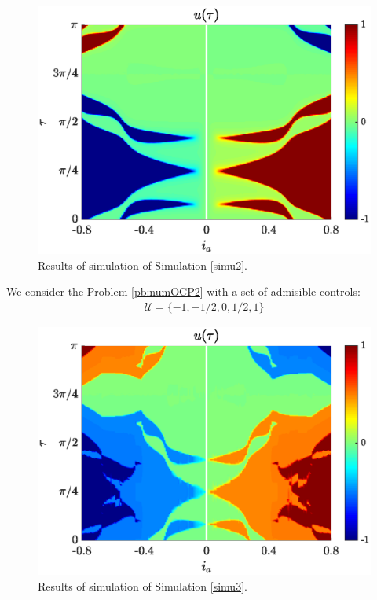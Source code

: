 \documentclass[twocolumn]{autart}    %
\begin{document}
\begin{figure}[ht!]
    \hspace{0.05em}
    \includegraphics[scale=0.525]{img/fig06.eps}
    \caption{Results of simulation of Simulation \ref{simu2}.}
    \label{fig:sim-bang-off-bang}
\end{figure} 

\vspace{1em}
\begin{simulation}\label{simu3}
We consider the Problem \ref{pb:numOCP2} with a set of admisible controls:
\begin{gather}
    \mathcal{U} = \{-1,-1/2,0,1/2,1\}
\end{gather} 
\end{simulation}

\begin{figure}[ht!]
    \hspace{0.05em}
    \includegraphics[scale=0.525]{img/fig08.eps}
    \caption{Results of simulation of Simulation \ref{simu3}.}
    \label{fig:sim-multi-level}
\end{figure} 
\end{document}
